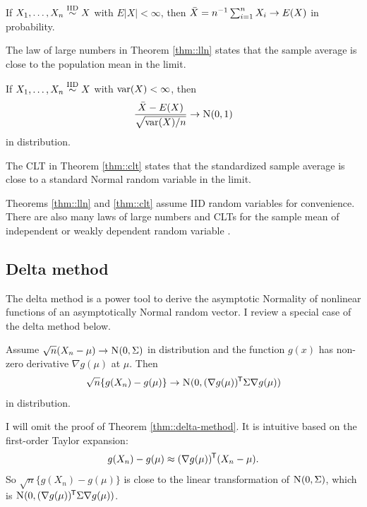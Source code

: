 \begin{theorem}
\label{thm::lln}
If $X_1,\ldots, X_n \stackrel{\textup{IID}}{\sim} X$ with $E| X| <\infty$, then $\bar{X} = n^{-1} \sum_{i=1}^n X_i \rightarrow E(X)$ in probability. 
\end{theorem}


The law of large numbers in Theorem \ref{thm::lln} states that the sample average is close to the population mean in the limit. 

\begin{theorem}
\label{thm::clt}
If $X_1,\ldots, X_n \stackrel{\textup{IID}}{\sim} X$ with $\textup{var} (X) <\infty$, then 
$$ 
\frac{   \bar{X} - E(X)   }
{ \sqrt{ \var (X) /n    } } \rightarrow \N01
$$  
in distribution. 
\end{theorem}

The CLT in Theorem \ref{thm::clt} states that the standardized sample average is close to a standard Normal random variable in the limit. 


Theorems \ref{thm::lln} and \ref{thm::clt} assume IID random variables for convenience. 
There are also many laws of large numbers and CLTs for the sample mean of independent or weakly dependent random variable \citep[e.g.,][]{durrett2019probability}. 




\subsection{Delta method}\label{section::delta-method}


The delta method is a power tool to derive the asymptotic Normality of nonlinear functions of an asymptotically Normal random vector. I review a special case of the delta method below.


\begin{theorem}
\label{thm::delta-method}
Assume $\sqrt{n} (X_n - \mu) \rightarrow \textsc{N}(0, \Sigma)$ in distribution and the function $g(x)$ has non-zero derivative $ \nabla g(\mu)   $ at $\mu$. Then
$$
\sqrt{n} \{  g(X_n) - g(\mu) \}  \rightarrow \textsc{N} (0,   (\nabla g(\mu) ) ^{\mkern-1.5mu\mathsf{T}}  \Sigma \nabla g(\mu)  )
$$
in distribution.
\end{theorem}  

I will omit the proof of Theorem \ref{thm::delta-method}. It is intuitive based on the first-order Taylor expansion:
$$
g(X_n) - g(\mu) \approx  (\nabla g(\mu) ) ^{\mkern-1.5mu\mathsf{T}}  (X_n - \mu) .
$$
So $\sqrt{n} \{  g(X_n) - g(\mu) \} $ is close to the linear transformation of $\textsc{N}(0, \Sigma)$, which is $\textsc{N} (0,   (\nabla g(\mu) ) ^{\mkern-1.5mu\mathsf{T}}  \Sigma \nabla g(\mu)  )$. 




